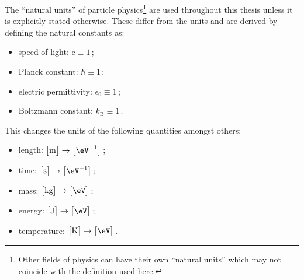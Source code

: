 The ``natural units'' of particle physics\footnote{Other fields of physics can have their own ``natural units'' which may not coincide with the definition used here.} are used throughout this thesis unless it is explicitly stated otherwise. These differ from the  units and are derived by defining the natural constants as:

\begin{itemize}
\item speed of light: $\mathrm{c}\equiv 1$\,;
\item Planck constant: $\hbar\equiv 1$\,;
\item electric permittivity: $\epsilon_{0}\equiv 1$\,;
\item Boltzmann constant: $k_\mathrm{B}\equiv 1$\,.
\end{itemize}

This changes the units of the following quantities amongst others:

\begin{itemize}
\item length: $\big[\mathrm{m}\big]\rightarrow \big[\eV^{-1}\big]$\,;
\item time: $\big[\mathrm{s}\big]\rightarrow \big[\eV^{-1}\big]$\,;
\item mass: $\big[\mathrm{kg}\big]\rightarrow \big[\eV\big]$\,;
\item energy: $\big[\mathrm{J}\big]\rightarrow \big[\eV\big]$\,;
\item temperature: $\big[\mathrm{K}\big]\rightarrow \big[\eV\big]$\,.
\end{itemize}



